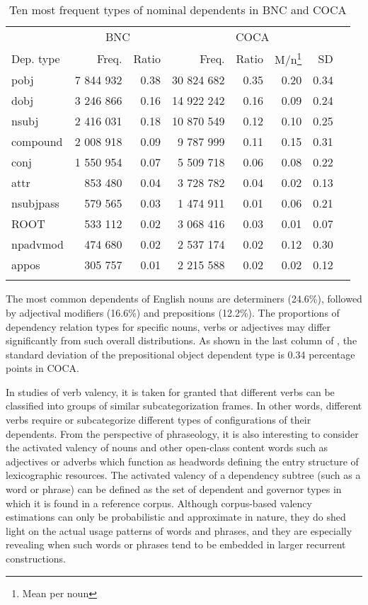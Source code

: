 \documentclass[output=paper]{langscibook}
\begin{document}
\begin{table}
\begin{tabular}{l rrr  rrrr}
\lsptoprule
& \multicolumn{2}{c}{BNC} & \multicolumn{4}{c}{COCA}\\\cmidrule(lr){2-3}\cmidrule(lr){4-7}
Dep. type & Freq. & Ratio & Freq. & Ratio & M/n\footnote{Mean per noun} & SD\\\midrule
pobj      &  7 844 932 &  0.38 & 30 824 682 &  0.35 &  0.20 &  0.34\\
dobj      &  3 246 866 &  0.16 & 14 922 242 &  0.16 &  0.09 &  0.24\\
nsubj     &  2 416 031 &  0.18 & 10 870 549 &  0.12 &  0.10 &  0.25\\
compound  &  2 008 918 &  0.09 & 9 787 999  &  0.11 &  0.15 &  0.31\\
conj      &  1 550 954 &  0.07 & 5 509 718  &  0.06 &  0.08 &  0.22\\
attr      &  853 480   &  0.04 & 3 728 782  &  0.04 &  0.02 &  0.13\\
nsubjpass &  579 565   &  0.03 & 1 474 911  &  0.01 &  0.06 &  0.21\\ 
ROOT      &  533 112   &  0.02 & 3 068 416  &  0.03 &  0.01 &  0.07\\
npadvmod  &  474 680   &  0.02 & 2 537 174  &  0.02 &  0.12 &  0.30\\
appos     &  305 757   &  0.01 & 2 215 588  &  0.02 &  0.02 &  0.12\\ 
\lspbottomrule
\end{tabular}
\caption{\label{tab:pezik:5}Ten most frequent types of nominal dependents in BNC and COCA}
\end{table}

The most common dependents of English nouns are determiners (24.6\%), followed by adjectival modifiers (16.6\%) and prepositions (12.2\%). The proportions of dependency relation types for specific nouns, verbs or adjectives may differ significantly from such overall distributions. As shown in the last column of , the standard deviation of the prepositional object dependent type is 0.34 percentage points in COCA. 

In studies of verb valency, it is taken for granted that different verbs can be classified into groups of similar subcategorization frames. In other words, different verbs require or subcategorize different types of configurations of their dependents. From the perspective of phraseology, it is also interesting to consider the activated valency of nouns and other open-class content words such as adjectives or adverbs which function as headwords defining the entry structure of lexicographic resources. The activated valency of a dependency subtree (such as a word or phrase) can be defined as the set of dependent and governor types in which it is found in a reference corpus. Although corpus-based valency estimations can only be probabilistic and approximate in nature, they do shed light on the actual usage patterns of words and phrases, and they are especially revealing when such words or phrases tend to be embedded in larger recurrent constructions.
\end{document}
